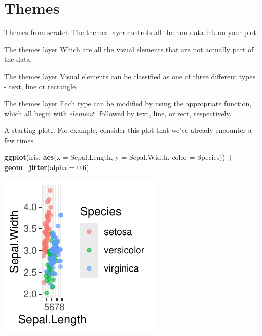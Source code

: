 \documentclass[
  ignorenonframetext,
]{beamer}
\newenvironment{Shaded}{\begin{snugshade}}{\end{snugshade}}
\newcommand{\AttributeTok}[1]{\textcolor[rgb]{0.13,0.29,0.53}{#1}}
\newcommand{\FloatTok}[1]{\textcolor[rgb]{0.00,0.00,0.81}{#1}}
\newcommand{\FunctionTok}[1]{\textcolor[rgb]{0.13,0.29,0.53}{\textbf{#1}}}
\newcommand{\NormalTok}[1]{#1}
\newcommand{\SpecialCharTok}[1]{\textcolor[rgb]{0.81,0.36,0.00}{\textbf{#1}}}
\begin{document}
\section{Themes}\label{themes-2}

\begin{frame}{Themes from scratch}
\label{themes-from-scratch}
The themes layer controls all the non-data ink on your plot.
\end{frame}

\begin{frame}{The themes layer}
\label{the-themes-layer}
Which are all the visual elements that are not actually part of the
data.
\end{frame}

\begin{frame}{The themes layer}
\label{the-themes-layer-1}
Visual elements can be classified as one of three different types -
text, line or rectangle.
\end{frame}

\begin{frame}{The themes layer}
\label{the-themes-layer-2}
Each type can be modified by using the appropriate function, which all
begin with \(element\_\) followed by text, line, or rect, respectively.
\end{frame}

\begin{frame}[fragile]{A starting plot\ldots{}}
\label{a-starting-plot}
For example, consider this plot that we've already encounter a few
times.


\begin{Shaded}
\begin{Highlighting}[]
\FunctionTok{ggplot}\NormalTok{(iris, }\FunctionTok{aes}\NormalTok{(}\AttributeTok{x =}\NormalTok{ Sepal.Length, }\AttributeTok{y =}\NormalTok{ Sepal.Width, }\AttributeTok{color =}\NormalTok{ Species)) }\SpecialCharTok{+}
    \FunctionTok{geom\_jitter}\NormalTok{(}\AttributeTok{alpha =} \FloatTok{0.6}\NormalTok{)}
\end{Highlighting}
\end{Shaded}

\begin{center}\includegraphics[width=0.5\linewidth]{Figs/unnamed-chunk-62-1} \end{center}
\end{frame}
\end{document}
